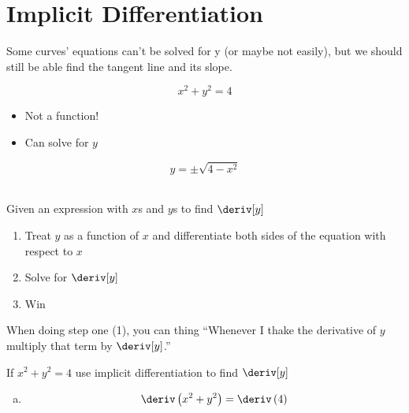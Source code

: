 
\section{Implicit Differentiation}
Some curves' equations can't be solved for y (or maybe not easily), but we should still be able find the tangent line and its slope.
\begin{example}
    \begin{equation*}
        x^2 + y^2 = 4
    \end{equation*}
    \begin{itemize}
        \item Not a function!
        \item Can solve for $y$
    \end{itemize}
    \begin{equation*}
        y = \pm \sqrt{4 - x^2}
    \end{equation*}
    \\
    Given an expression with $x$s and $y$s to find $\deriv[y]$
    \begin{enumerate}
        \item Treat $y$ as a function of $x$ and differentiate both sides of the equation with respect to $x$
        \item Solve for $\deriv[y]$
        \item Win
    \end{enumerate}
    \begin{note}
        When doing step one (1), you can thing ``Whenever I thake the derivative of $y$ multiply that term by $\deriv[y]$.''
    \end{note}
    \begin{example}
        If $x^2 + y^2 = 4$ use implicit differentiation to find $\deriv[y]$
        \begin{enumerate}[a)]
            \item \begin{gather*}
                \deriv \left(x^2 + y^2\right) = \deriv \left(4\right) \\

\end{gather*}
\end{enumerate}
\end{example}
\end{example}
